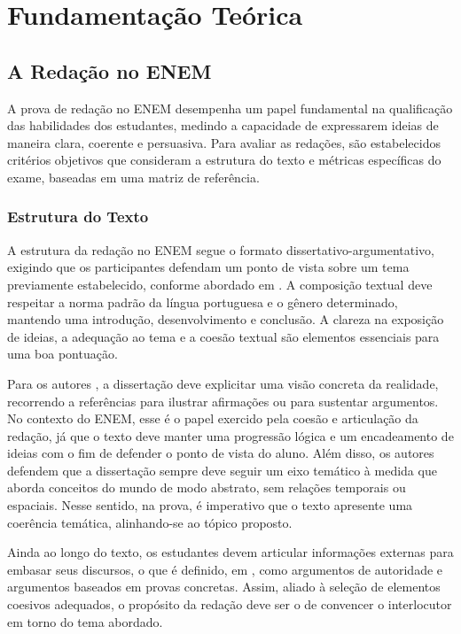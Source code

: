 \chapter{Fundamentação Teórica}
\label{chap:fund}

\section{A Redação no ENEM}

A prova de redação no ENEM desempenha um papel fundamental na qualificação das habilidades dos estudantes, medindo a capacidade de expressarem ideias de maneira clara, coerente e persuasiva. Para avaliar as redações, são estabelecidos critérios objetivos que consideram a estrutura do texto e métricas específicas do exame, baseadas em uma matriz de referência.

\subsection{Estrutura do Texto}

A estrutura da redação no ENEM segue o formato dissertativo-argumentativo, exigindo que os participantes defendam um ponto de vista sobre um tema previamente estabelecido, conforme abordado em \cite{cartilha-redacao}. A composição textual deve respeitar a norma padrão da língua portuguesa e o gênero determinado, mantendo uma introdução, desenvolvimento e conclusão. A clareza na exposição de ideias, a adequação ao tema e a coesão textual são elementos essenciais para uma boa pontuação.

Para os autores \citet{platao-e-fiorin}, a dissertação deve explicitar uma visão concreta da realidade, recorrendo a referências para ilustrar afirmações ou para sustentar argumentos. No contexto do ENEM, esse é o papel exercido pela coesão e articulação da redação, já que o texto deve manter uma progressão lógica e um encadeamento de ideias com o fim de defender o ponto de vista do aluno. Além disso, os autores defendem que a dissertação sempre deve seguir um eixo temático à medida que aborda conceitos do mundo de modo abstrato, sem relações temporais ou espaciais. Nesse sentido, na prova, é imperativo que o texto apresente uma coerência temática, alinhando-se ao tópico proposto.

Ainda ao longo do texto, os estudantes devem articular informações externas para embasar seus discursos, o que é definido, em \cite{platao-e-fiorin}, como argumentos de autoridade e argumentos baseados em provas concretas. Assim, aliado à seleção de elementos coesivos adequados, o propósito da redação deve ser o de convencer o interlocutor em torno do tema abordado.

